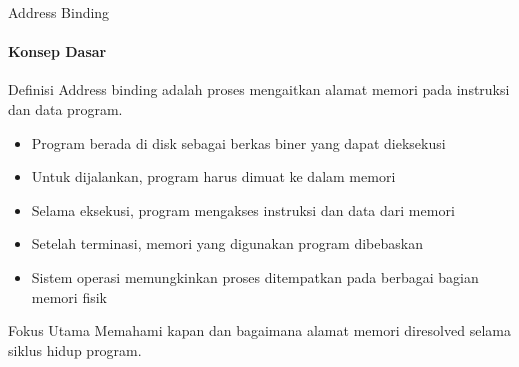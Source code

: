 \documentclass[10pt,aspectratio=169]{beamer}
\begin{document}
\begin{frame}{Address Binding}
    \framesubtitle{Konsep Dasar}
    
    \begin{block}{Definisi}
        Address binding adalah proses mengaitkan alamat memori pada instruksi dan data program.
    \end{block}
    
    \begin{itemize}
        \item Program berada di disk sebagai berkas biner yang dapat dieksekusi
        \item Untuk dijalankan, program harus dimuat ke dalam memori
        \item Selama eksekusi, program mengakses instruksi dan data dari memori
        \item Setelah terminasi, memori yang digunakan program dibebaskan
        \item Sistem operasi memungkinkan proses ditempatkan pada berbagai bagian memori fisik
    \end{itemize}
    
    \begin{alertblock}{Fokus Utama}
        Memahami kapan dan bagaimana alamat memori diresolved selama siklus hidup program.
    \end{alertblock}
\end{frame}
\end{document}
